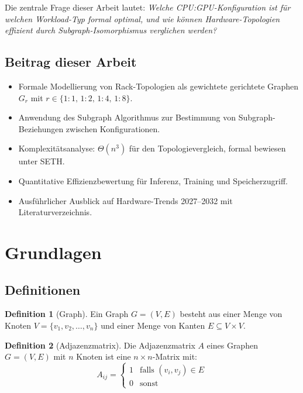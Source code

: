 ﻿\documentclass[a4paper,12pt]{article}
\theoremstyle{definition}
\newtheorem{definition}{Definition}
\begin{document}
Die zentrale Frage dieser Arbeit lautet: \emph{Welche CPU:GPU-Konfiguration ist
f\"ur welchen Workload-Typ formal optimal, und wie k\"onnen Hardware-Topologien
effizient durch Subgraph-Isomorphismus verglichen werden?}

\subsection{Beitrag dieser Arbeit}

\begin{itemize}
  \item Formale Modellierung von Rack-Topologien als gewichtete gerichtete Graphen $G_{r}$
        mit $r \in \{1:1,\,1:2,\,1:4,\,1:8\}$.
  \item Anwendung des Subgraph Algorithmus \cite{epp2026subgraph} zur Bestimmung von
        Subgraph-Beziehungen zwischen Konfigurationen.
  \item Komplexit\"atsanalyse: $\Theta(n^3)$ f\"ur den Topologievergleich, formal bewiesen
        unter SETH.
  \item Quantitative Effizienzbewertung f\"ur Inferenz, Training und Speicherzugriff.
  \item Ausf\"uhrlicher Ausblick auf Hardware-Trends 2027--2032 mit Literaturverzeichnis.
\end{itemize}

\section{Grundlagen}

\subsection{Definitionen}

\begin{definition}[Graph]
  Ein Graph $G = (V, E)$ besteht aus einer Menge von Knoten
  $V = \{v_1, v_2, \ldots, v_n\}$ und einer Menge von Kanten $E \subseteq V \times V$.
\end{definition}

\begin{definition}[Adjazenzmatrix]
  Die Adjazenzmatrix $A$ eines Graphen $G = (V, E)$ mit $n$ Knoten ist eine
  $n \times n$-Matrix mit:
  \[
    A_{ij} = \begin{cases}
      1 & \text{falls } (v_i, v_j) \in E \\
      0 & \text{sonst}
    \end{cases}
  \]
\end{definition}
\end{document}
